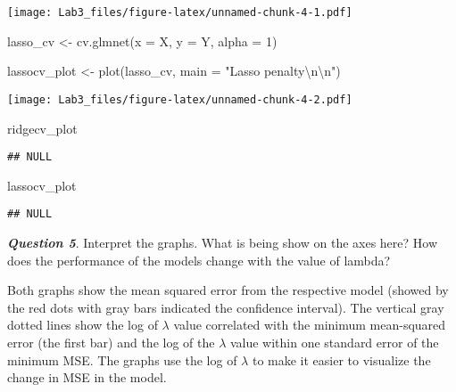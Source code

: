 \documentclass[
]{article}
\newenvironment{Shaded}{\begin{snugshade}}{\end{snugshade}}
\newcommand{\AttributeTok}[1]{\textcolor[rgb]{0.77,0.63,0.00}{#1}}
\newcommand{\DecValTok}[1]{\textcolor[rgb]{0.00,0.00,0.81}{#1}}
\newcommand{\FunctionTok}[1]{\textcolor[rgb]{0.00,0.00,0.00}{#1}}
\newcommand{\NormalTok}[1]{#1}
\newcommand{\OtherTok}[1]{\textcolor[rgb]{0.56,0.35,0.01}{#1}}
\newcommand{\SpecialCharTok}[1]{\textcolor[rgb]{0.00,0.00,0.00}{#1}}
\newcommand{\StringTok}[1]{\textcolor[rgb]{0.31,0.60,0.02}{#1}}
\begin{document}
\texttt{[image: Lab3\_files/figure-latex/unnamed-chunk-4-1.pdf]}

\begin{Shaded}
\begin{Highlighting}[]
\NormalTok{lasso\_cv }\OtherTok{\textless{}{-}} \FunctionTok{cv.glmnet}\NormalTok{(}\AttributeTok{x =}\NormalTok{ X,}
                       \AttributeTok{y =}\NormalTok{ Y,}
                       \AttributeTok{alpha =} \DecValTok{1}\NormalTok{)}

\NormalTok{lassocv\_plot }\OtherTok{\textless{}{-}} \FunctionTok{plot}\NormalTok{(lasso\_cv, }\AttributeTok{main =} \StringTok{"Lasso penalty}\SpecialCharTok{\textbackslash{}n\textbackslash{}n}\StringTok{"}\NormalTok{) }
\end{Highlighting}
\end{Shaded}

\texttt{[image: Lab3\_files/figure-latex/unnamed-chunk-4-2.pdf]}

\begin{Shaded}
\begin{Highlighting}[]
\NormalTok{ ridgecv\_plot }
\end{Highlighting}
\end{Shaded}

\begin{verbatim}
## NULL
\end{verbatim}

\begin{Shaded}
\begin{Highlighting}[]
\NormalTok{ lassocv\_plot}
\end{Highlighting}
\end{Shaded}

\begin{verbatim}
## NULL
\end{verbatim}

\textbf{\emph{Question 5}}. Interpret the graphs. What is being show on
the axes here? How does the performance of the models change with the
value of lambda?

Both graphs show the mean squared error from the respective model
(showed by the red dots with gray bars indicated the confidence
interval). The vertical gray dotted lines show the log of \(\lambda\)
value correlated with the minimum mean-squared error (the first bar) and
the log of the \(\lambda\) value within one standard error of the
minimum MSE. The graphs use the log of \(\lambda\) to make it easier to
visualize the change in MSE in the model.
\end{document}
